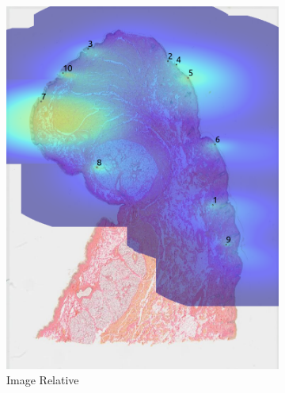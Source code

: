 \documentclass[a4paper,11pt]{report}
\numberwithin{figure}{section} %
\begin{document}
\begin{itemize}
\begin{figure}[H]
\begin{subfigure}[b]{0.19\textwidth}
            \includegraphics[width=\textwidth]{images/5501147_heatmap_image.png}
            \caption{Image Relative}
            \end{subfigure}
            \begin{subfigure}[b]{0.19\textwidth}

\end{subfigure}
\end{figure}
\end{itemize}
\end{document}
